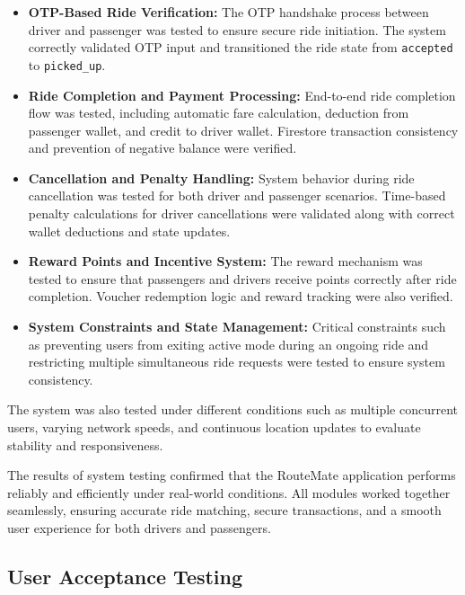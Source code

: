\documentclass[10pt,a4paper]{report}
\begin{document}
\begin{itemize}
\item \textbf{OTP-Based Ride Verification:}
The OTP handshake process between driver and passenger was tested to ensure secure ride initiation. The system correctly validated OTP input and transitioned the ride state from \texttt{accepted} to \texttt{picked\_up}.

\item \textbf{Ride Completion and Payment Processing:}
End-to-end ride completion flow was tested, including automatic fare calculation, deduction from passenger wallet, and credit to driver wallet. Firestore transaction consistency and prevention of negative balance were verified.

\item \textbf{Cancellation and Penalty Handling:}
System behavior during ride cancellation was tested for both driver and passenger scenarios. Time-based penalty calculations for driver cancellations were validated along with correct wallet deductions and state updates.

\item \textbf{Reward Points and Incentive System:}
The reward mechanism was tested to ensure that passengers and drivers receive points correctly after ride completion. Voucher redemption logic and reward tracking were also verified.

\item \textbf{System Constraints and State Management:}
Critical constraints such as preventing users from exiting active mode during an ongoing ride and restricting multiple simultaneous ride requests were tested to ensure system consistency.

\end{itemize}

\justify\large The system was also tested under different conditions such as multiple concurrent users, varying network speeds, and continuous location updates to evaluate stability and responsiveness.

\justify\large The results of system testing confirmed that the RouteMate application performs reliably and efficiently under real-world conditions. All modules worked together seamlessly, ensuring accurate ride matching, secure transactions, and a smooth user experience for both drivers and passengers.

\subsection{User Acceptance Testing}
\end{document}
